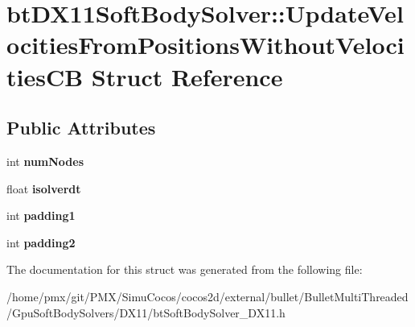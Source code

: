 \hypertarget{structbtDX11SoftBodySolver_1_1UpdateVelocitiesFromPositionsWithoutVelocitiesCB}{}\section{bt\+D\+X11\+Soft\+Body\+Solver\+:\+:Update\+Velocities\+From\+Positions\+Without\+Velocities\+CB Struct Reference}
\label{structbtDX11SoftBodySolver_1_1UpdateVelocitiesFromPositionsWithoutVelocitiesCB}
\subsection*{Public Attributes}
\begin{DoxyCompactItemize}
\item 
\mbox{\label{structbtDX11SoftBodySolver_1_1UpdateVelocitiesFromPositionsWithoutVelocitiesCB_afa7d5635891ac971d8f4195c1c060808}} 
int {\bfseries num\+Nodes}
\item 
\mbox{\label{structbtDX11SoftBodySolver_1_1UpdateVelocitiesFromPositionsWithoutVelocitiesCB_a5c0bdf0a6753765a41790da44144f0df}} 
float {\bfseries isolverdt}
\item 
\mbox{\label{structbtDX11SoftBodySolver_1_1UpdateVelocitiesFromPositionsWithoutVelocitiesCB_a43a6da7c2f14a5cf8e68b3f596639eef}} 
int {\bfseries padding1}
\item 
\mbox{\label{structbtDX11SoftBodySolver_1_1UpdateVelocitiesFromPositionsWithoutVelocitiesCB_ac67ec67eb2f630193117cf6984ccb027}} 
int {\bfseries padding2}
\end{DoxyCompactItemize}


The documentation for this struct was generated from the following file\+:\begin{DoxyCompactItemize}
\item 
/home/pmx/git/\+P\+M\+X/\+Simu\+Cocos/cocos2d/external/bullet/\+Bullet\+Multi\+Threaded/\+Gpu\+Soft\+Body\+Solvers/\+D\+X11/bt\+Soft\+Body\+Solver\+\_\+\+D\+X11.\+h\end{DoxyCompactItemize}
